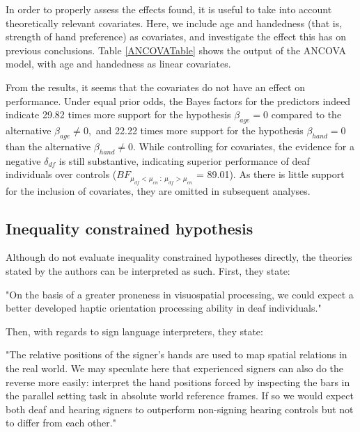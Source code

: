 \documentclass[11pt,a4paper]{article}\usepackage[]{graphicx}\usepackage[]{color}
\begin{document}
In order to properly assess the effects found, it is useful to take into account theoretically relevant covariates. Here, we include age and handedness (that is, strength of hand preference) as covariates, and investigate the effect this has on previous conclusions. Table \ref{ANCOVATable} shows the output of the ANCOVA model, with age and handedness as linear covariates.

From the results, it seems that the covariates do not have an effect on performance. Under equal prior odds, the Bayes factors for the predictors indeed indicate 29.82 times more support for the hypothesis \( \beta_{age} = 0 \) compared to the alternative \( \beta_{age} \neq 0, \) and 22.22 times more support for the hypothesis \( \beta_{hand} = 0\) than the alternative \( \beta_{hand} \neq 0.\) While controlling for covariates, the evidence for a negative \( \delta_{df}\) is still substantive, indicating superior performance of deaf individuals over controls (\(BF_{\mu_{df} < \mu_{cn} ~ : ~ \mu_{df} > \mu_{cn}} \) = 89.01). As there is little support for the inclusion of covariates, they are omitted in subsequent analyses.


\subsection{Inequality constrained hypothesis} \label{complexineq}

Although \citet{van2013superior} do not evaluate inequality constrained hypotheses directly, the theories stated by the authors can be interpreted as such. First, they state:

\begin{displayquote}
"On the basis of a greater proneness in visuospatial processing, we could expect a better developed haptic orientation processing ability in deaf individuals."
\end{displayquote}

Then, with regards to sign language interpreters, they state:

\begin{displayquote}
"The relative positions of the signer's hands are used to map spatial relations in the real world. We may speculate here that experienced signers can also do the reverse more easily: interpret the hand positions forced by inspecting the bars in the parallel setting task in absolute world reference frames. If so we would expect both deaf and hearing signers to outperform non-signing hearing controls but not to differ from each other."
\end{displayquote}
\end{document}
